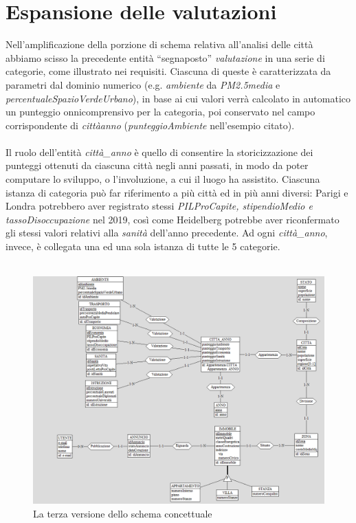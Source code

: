 \documentclass[a4paper,12pt]{report}
\begin{document}
        \section{Espansione delle valutazioni}
        Nell’amplificazione della porzione di schema relativa all’analisi delle città abbiamo scisso la precedente entità 
        “segnaposto” \textit{valutazione} in una serie di categorie, come illustrato nei requisiti. Ciascuna di queste è caratterizzata 
        da parametri dal dominio numerico (e.g. \textit{ambiente} da \textit{PM2.5media} e \textit{percentualeSpazioVerdeUrbano}), in
        base ai cui valori verrà calcolato in automatico un punteggio onnicomprensivo per la categoria, poi conservato nel campo 
        corrispondente di \textit{città\textunderscore anno} (\textit{punteggioAmbiente} nell’esempio citato). \\
        \\
        Il ruolo dell’entità \textit{città\_anno} è quello di consentire la storicizzazione dei punteggi ottenuti da ciascuna città 
        negli anni passati, in modo da poter computare lo sviluppo, o l’involuzione, a cui il luogo ha assistito. Ciascuna istanza 
        di categoria può far riferimento a più città ed in più anni diversi: Parigi e Londra potrebbero aver registrato stessi 
        \textit{PILProCapite, stipendioMedio e tassoDisoccupazione} nel 2019, così come Heidelberg potrebbe aver riconfermato gli 
        stessi valori relativi alla \textit{sanità} dell'anno precedente. Ad ogni \textit{città\_anno}, invece, è collegata una ed 
        una sola istanza di tutte le 5 categorie. \\
        \\
        
        \begin{figure}[ht]
            \centering{}
            \includegraphics[width=\linewidth]{./images/third.png}
            \caption{La terza versione dello schema concettuale}
        \end{figure}
\end{document}
